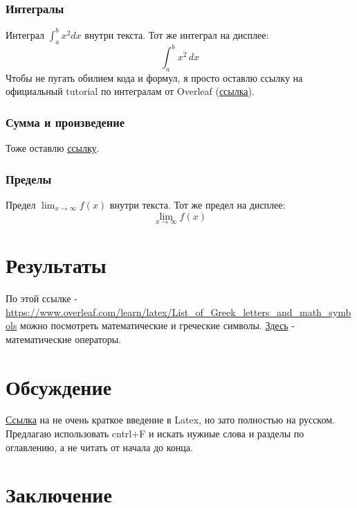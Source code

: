 \documentclass[12pt, oneside, a4paper]{article} %
\begin{document}
\begin{sloppypar}
\subsubsection{Интегралы}
Интеграл \(\int_{a}^{b} x^2 dx\) внутри текста.
\medskip
Тот же интеграл на дисплее:
\[
\int_{a}^{b} x^2 \,dx
\]
Чтобы не пугать обилием кода и формул, я просто оставлю ссылку на официальный tutorial по интегралам от Overleaf (\href{https://www.overleaf.com/learn/latex/Integrals,_sums_and_limits#Integrals}{ссылка}).

\subsubsection{Сумма и произведение}
Тоже оставлю \href{https://www.overleaf.com/learn/latex/Integrals,_sums_and_limits#Sums_and_products}{ссылку}.

\subsubsection{Пределы}

Предел \(\lim_{x\to\infty} f(x)\) внутри текста.
Тот же предел на дисплее:
\[
\lim_{x\to\infty} f(x)
\]

\section{Результаты}
По этой ссылке - \url{https://www.overleaf.com/learn/latex/List_of_Greek_letters_and_math_symbols} можно посмотреть математические и греческие символы. \href{https://www.overleaf.com/learn/latex/Operators}{Здесь} - математические операторы.



\section{Обсуждение}
\href{https://www.texlive.info/CTAN/info/lshort/russian/lshortru.pdf}{Ссылка} на не очень краткое введение в Latex, но зато полностью на русском. Предлагаю использовать cntrl+F и искать нужные слова и разделы по оглавлению, а не читать от начала до конца.

\section{Заключение}


\newpage




\end{sloppypar}
\end{document}
